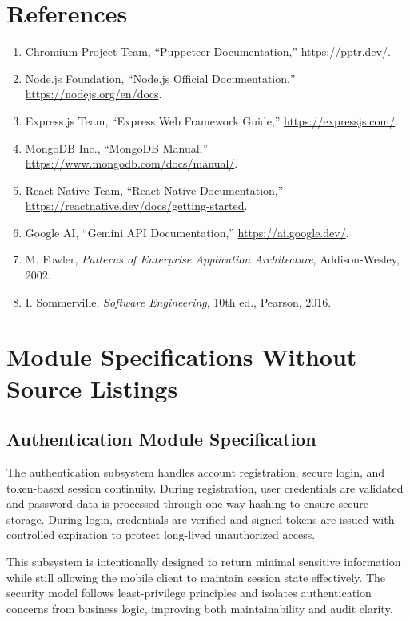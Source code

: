 \documentclass[12pt,a4paper,oneside]{report}
\begin{document}
\chapter*{References}
\begin{enumerate}[leftmargin=0.35in]
\item Chromium Project Team, ``Puppeteer Documentation,'' \url{https://pptr.dev/}.
\item Node.js Foundation, ``Node.js Official Documentation,'' \url{https://nodejs.org/en/docs}.
\item Express.js Team, ``Express Web Framework Guide,'' \url{https://expressjs.com/}.
\item MongoDB Inc., ``MongoDB Manual,'' \url{https://www.mongodb.com/docs/manual/}.
\item React Native Team, ``React Native Documentation,'' \url{https://reactnative.dev/docs/getting-started}.
\item Google AI, ``Gemini API Documentation,'' \url{https://ai.google.dev/}.
\item M. Fowler, \textit{Patterns of Enterprise Application Architecture}, Addison-Wesley, 2002.
\item I. Sommerville, \textit{Software Engineering}, 10th ed., Pearson, 2016.
\end{enumerate}

\appendix
\chapter{Module Specifications Without Source Listings}
\section{Authentication Module Specification}
The authentication subsystem handles account registration, secure login, and token-based session continuity. During registration, user credentials are validated and password data is processed through one-way hashing to ensure secure storage. During login, credentials are verified and signed tokens are issued with controlled expiration to protect long-lived unauthorized access.

This subsystem is intentionally designed to return minimal sensitive information while still allowing the mobile client to maintain session state effectively. The security model follows least-privilege principles and isolates authentication concerns from business logic, improving both maintainability and audit clarity.
\end{document}
